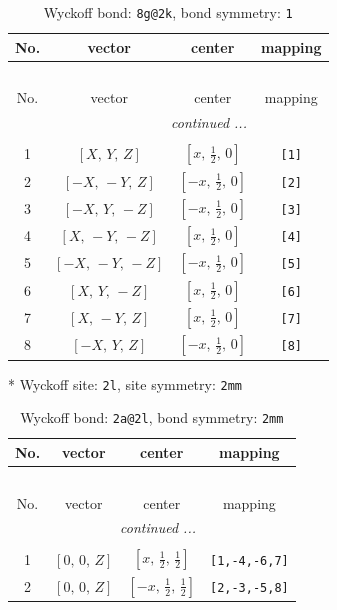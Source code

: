 \documentclass[fleqn,8pt]{jsarticle}
\begin{document}
\begin{longtable}{cccc}
\caption{Wyckoff bond: {\tt 8g@2k}, bond symmetry: {\tt 1}}
 \\
 \hline \hline
No. & vector & center & mapping \\ \hline \endfirsthead

\multicolumn{3}{l}{\tablename\ \thetable{}} \\
 \hline \hline
No. & vector & center & mapping \\ \hline \endhead

 \hline \hline
\multicolumn{3}{r}{\footnotesize\it continued ...} \\ \endfoot

 \hline \hline
\multicolumn{3}{r}{} \\ \endlastfoot

1 & $\left[ X,\, Y,\, Z \right]$ & $\left[ x,\, \frac{1}{2},\, 0 \right]$ & {\tt [1]} \\ \hline
2 & $\left[ - X,\, - Y,\, Z \right]$ & $\left[ - x,\, \frac{1}{2},\, 0 \right]$ & {\tt [2]} \\ \hline
3 & $\left[ - X,\, Y,\, - Z \right]$ & $\left[ - x,\, \frac{1}{2},\, 0 \right]$ & {\tt [3]} \\ \hline
4 & $\left[ X,\, - Y,\, - Z \right]$ & $\left[ x,\, \frac{1}{2},\, 0 \right]$ & {\tt [4]} \\ \hline
5 & $\left[ - X,\, - Y,\, - Z \right]$ & $\left[ - x,\, \frac{1}{2},\, 0 \right]$ & {\tt [5]} \\ \hline
6 & $\left[ X,\, Y,\, - Z \right]$ & $\left[ x,\, \frac{1}{2},\, 0 \right]$ & {\tt [6]} \\ \hline
7 & $\left[ X,\, - Y,\, Z \right]$ & $\left[ x,\, \frac{1}{2},\, 0 \right]$ & {\tt [7]} \\ \hline
8 & $\left[ - X,\, Y,\, Z \right]$ & $\left[ - x,\, \frac{1}{2},\, 0 \right]$ & {\tt [8]} \\
\end{longtable}
* Wyckoff site: {\tt 2l}, site symmetry: {\tt 2mm}
\renewcommand{\arraystretch}{1.2}
\begin{longtable}{cccc}
\caption{Wyckoff bond: {\tt 2a@2l}, bond symmetry: {\tt 2mm}}
 \\
 \hline \hline
No. & vector & center & mapping \\ \hline \endfirsthead

\multicolumn{3}{l}{\tablename\ \thetable{}} \\
 \hline \hline
No. & vector & center & mapping \\ \hline \endhead

 \hline \hline
\multicolumn{3}{r}{\footnotesize\it continued ...} \\ \endfoot

 \hline \hline
\multicolumn{3}{r}{} \\ \endlastfoot

1 & $\left[ 0,\, 0,\, Z \right]$ & $\left[ x,\, \frac{1}{2},\, \frac{1}{2} \right]$ & {\tt [1,-4,-6,7]} \\ \hline
2 & $\left[ 0,\, 0,\, Z \right]$ & $\left[ - x,\, \frac{1}{2},\, \frac{1}{2} \right]$ & {\tt [2,-3,-5,8]} \\
\end{longtable}
\end{document}
